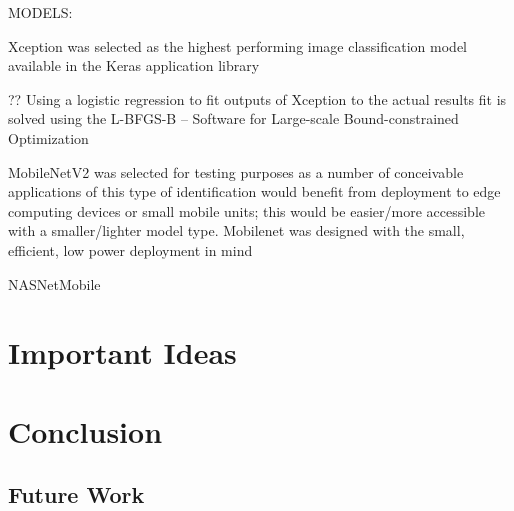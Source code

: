 \documentclass[]{article}
\begin{document}
MODELS:

Xception \cite{Chollet2016}
was selected as the highest performing image classification model available in the Keras application library

?? Using a logistic regression to fit outputs of Xception to the actual results 
fit is solved using the L-BFGS-B – Software for Large-scale Bound-constrained Optimization \cite{Zhu1997}

MobileNetV2 \cite{Howard2017} \cite{Sandler2019}
was selected for testing purposes as a number of conceivable applications of this type of identification would benefit from deployment to edge computing devices or small mobile units; this would be easier/more accessible with a smaller/lighter model type.
Mobilenet was designed with the small, efficient, low power deployment in mind 


NASNetMobile

\section{Important Ideas}
	\subsection{}
	


	
\section{Conclusion}

\subsection{Future Work}



\clearpage


\end{document}
